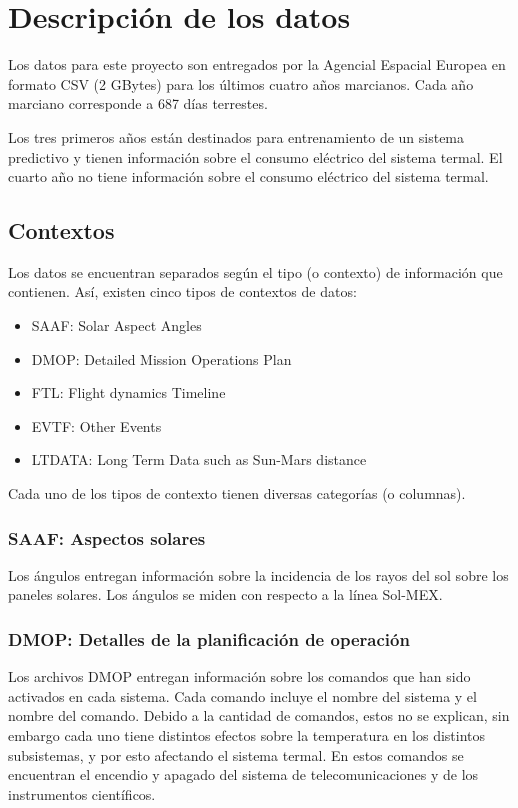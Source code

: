 \documentclass[../Main.tex]{subfiles}
\begin{document}
\section*{Descripción de los datos}

Los datos para este proyecto son entregados por la Agencial Espacial Europea en formato CSV (2 GBytes) para los últimos cuatro años marcianos. Cada año marciano corresponde a 687 días terrestes.
\newline \par
Los tres primeros años están destinados para entrenamiento de un sistema predictivo y tienen información sobre el consumo eléctrico del sistema termal. El cuarto año no tiene información sobre el consumo eléctrico del sistema termal.
\subsection*{Contextos}
Los datos se encuentran separados según el tipo (o contexto) de información que contienen. Así, existen cinco tipos de contextos de datos:
\begin{itemize}
    \item SAAF: Solar Aspect Angles
    \item DMOP: Detailed Mission Operations Plan
    \item FTL: Flight dynamics Timeline
    \item EVTF: Other Events
    \item LTDATA: Long Term Data such as Sun-Mars distance
\end{itemize}

Cada uno de los tipos de contexto tienen diversas categorías (o columnas).
\subsubsection*{SAAF: Aspectos solares}
Los ángulos entregan información sobre la incidencia de los rayos del sol sobre los paneles solares. Los ángulos se miden con respecto a la línea Sol-MEX.
\subsubsection*{DMOP: Detalles de la planificación de operación}
Los archivos DMOP entregan información sobre los comandos que han sido activados en cada sistema. Cada comando incluye el nombre del sistema y el nombre del comando. Debido a la cantidad de comandos, estos no se explican, sin embargo cada uno tiene distintos efectos sobre la temperatura en los distintos subsistemas, y por esto afectando el sistema termal. En estos comandos se encuentran el encendio y apagado del sistema de telecomunicaciones y de los instrumentos científicos.
\end{document}
